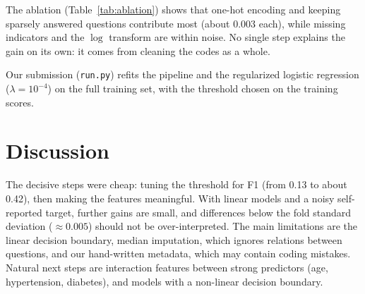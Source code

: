 \documentclass[10pt,conference,compsocconf]{IEEEtran}
\begin{document}
The ablation (Table~\ref{tab:ablation}) shows that one-hot encoding and
keeping sparsely answered questions contribute most (about $0.003$ each),
while missing indicators and the $\log$ transform are within noise. No single
step explains the gain on its own: it comes from cleaning the codes as a
whole.

Our submission (\texttt{run.py}) refits the pipeline and the regularized
logistic regression ($\lambda=10^{-4}$) on the full training set, with the
threshold chosen on the training scores.

\section{Discussion}

The decisive steps were cheap: tuning the threshold for F1 (from 0.13 to about
0.42), then making the features meaningful. With linear models and a noisy
self-reported target, further gains are small, and differences below the
fold standard deviation ($\approx0.005$) should not be over-interpreted. The
main limitations are the linear decision boundary, median imputation, which
ignores relations between questions, and our hand-written metadata, which may
contain coding mistakes. Natural next steps are interaction features between
strong predictors (age, hypertension, diabetes), and models with a non-linear
decision boundary.
\end{document}
